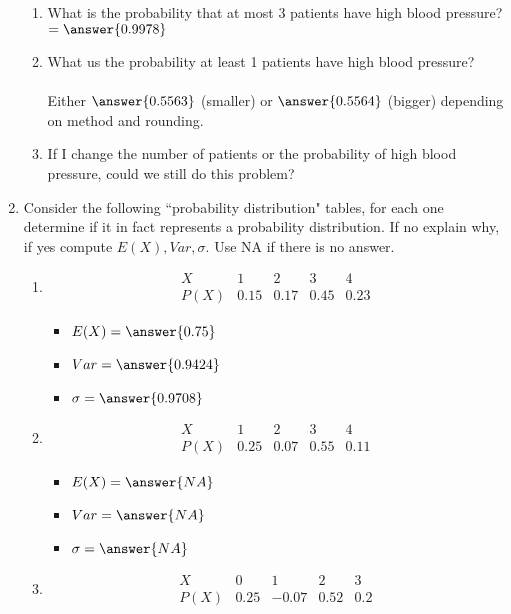 \documentclass{ximera}
\begin{document}
\begin{enumerate}
\begin{enumerate}
\item What is the probability that at most 3 patients have high blood pressure? $=\answer{0.9978}$
\item What us the probability at least 1 patients have high blood pressure? \\ \\Either $\answer{0.5563}$ (smaller) or $\answer{0.5564}$ (bigger)  depending on method and rounding. 
\item If I change the number of patients or the probability of high blood pressure, could we still do this problem?
\end{enumerate}
\item Consider the following ``probability distribution" tables, for each one determine if it in fact represents a probability distribution.  If no explain why, if yes compute $E(X), Var, \sigma$.   Use NA if there is no answer.
\begin{enumerate}
\item $$
\begin{array}{c|cccc}
X & 1 & 2 & 3 & 4\\
\hline
P(X) & 0.15 & 0.17 & 0.45 & 0.23
\end{array}
$$

\begin{itemize}
\item $E(X)=\answer{0.75}$
\item $Var=\answer{0.9424}$
\item $\sigma=\answer{0.9708}$
\end{itemize}




\item $$
\begin{array}{c|cccc}
X & 1 & 2 & 3 & 4\\
\hline
P(X) & 0.25 & 0.07 & 0.55 & 0.11
\end{array}
$$

\begin{itemize}
\item $E(X)=\answer{NA}$
\item $Var=\answer{NA}$
\item $\sigma=\answer{NA}$
\end{itemize}



\item $$
\begin{array}{c|cccc}
X & 0 & 1 & 2 & 3\\
\hline
P(X) & 0.25 & -0.07 & 0.52 & 0.2
\end{array}
$$


\end{enumerate}
\end{enumerate}
\end{document}
